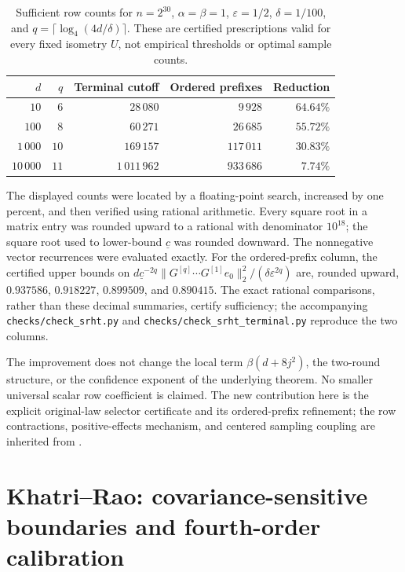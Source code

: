 \documentclass[11pt,a4paper]{article}
\theoremstyle{definition}\newtheorem{definition}[theorem]{Definition}
\theoremstyle{remark}\newtheorem{remark}[theorem]{Remark}
\numberwithin{equation}{section}
\begin{document}
\begin{table}[htbp]
\centering\small
\begin{tabular}{rrrrr}
\toprule
$d$ & $q$ & Terminal cutoff & Ordered prefixes & Reduction\\
\midrule
$10$ & $6$ & $28\,080$ & $9\,928$ & $64.64\%$\\
$100$ & $8$ & $60\,271$ & $26\,685$ & $55.72\%$\\
$1\,000$ & $10$ & $169\,157$ & $117\,011$ & $30.83\%$\\
$10\,000$ & $11$ & $1\,011\,962$ & $933\,686$ & $7.74\%$\\
\bottomrule
\end{tabular}
\caption{Sufficient row counts for $n=2^{30}$, $\alpha=\beta=1$,
$\varepsilon=1/2$, $\delta=1/100$, and
$q=\lceil\log_4(4d/\delta)\rceil$. These are certified prescriptions
valid for every fixed isometry $U$, not empirical thresholds or optimal
sample counts.}
\label{tab:srht-prefix-counts}
\end{table}

The displayed counts were located by a floating-point search, increased
by one percent, and then verified using rational arithmetic. Every square
root in a matrix entry was rounded upward to a rational with denominator
$10^{18}$; the square root used to lower-bound $\underline c$ was rounded
downward. The nonnegative vector recurrences were evaluated exactly.
For the ordered-prefix column, the certified upper bounds on
$d\underline c^{-2q}\|G^{[q]}\cdots G^{[1]}e_0\|_2^2/
(\delta\varepsilon^{2q})$ are, rounded upward,
$0.937586$, $0.918227$, $0.899509$, and $0.890415$.
The exact rational comparisons, rather than these decimal summaries,
certify sufficiency; the accompanying \texttt{checks/check\_srht.py} and
\texttt{checks/check\_srht\_terminal.py} reproduce the two columns.

The improvement does not change the local term
$\beta(d+8j^2)$, the two-round structure, or the confidence exponent of
the underlying theorem. No smaller universal scalar row coefficient is
claimed. The new contribution here is the explicit original-law
selector certificate and its ordered-prefix refinement; the row
contractions, positive-effects mechanism, and centered sampling coupling
are inherited from \cite{GradedSource,SRHTSource}.


\section{Khatri--Rao: covariance-sensitive boundaries and fourth-order calibration}
\label{sec:kr}
\end{document}
